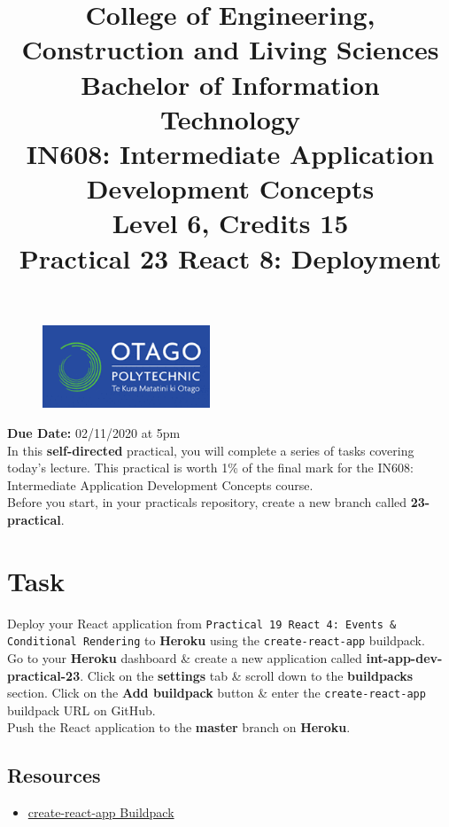 \documentclass{article}
\author{}
\begin{document}
\begin{figure}
	\centering
	\includegraphics[width=50mm]{img/logo.png}
\end{figure}

\title{College of Engineering, Construction and Living Sciences\\Bachelor of Information Technology\\IN608: Intermediate Application Development Concepts\\Level 6, Credits 15\\\textbf{Practical 23 React 8: Deployment}} 
\date{}
\maketitle 

\textbf{Due Date:} 02/11/2020 at 5pm \\

In this \textbf{self-directed} practical, you will complete a series of tasks covering today's lecture. This practical is worth 1\% of the final mark for the IN608: Intermediate Application Development Concepts course. \\

Before you start, in your practicals repository, create a new branch called \textbf{23-practical}. 

\section*{Task} 
Deploy your React application from \texttt{Practical 19 React 4: Events & Conditional Rendering} to \textbf{Heroku} using the \texttt{create-react-app} buildpack. \\

Go to your \textbf{Heroku} dashboard \& create a new application called \textbf{int-app-dev-practical-23}. Click on the \textbf{settings} tab \& scroll down to the \textbf{buildpacks} section. Click on the \textbf{Add buildpack} button \& enter the \texttt{create-react-app} buildpack URL on GitHub. \\

Push the React application to the \textbf{master} branch on \textbf{Heroku}. 

\subsection*{Resources} 
\begin{itemize}
  \item \href{https://github.com/mars/create-react-app-buildpack}{create-react-app Buildpack}
\end{itemize}
 
\end{document}
